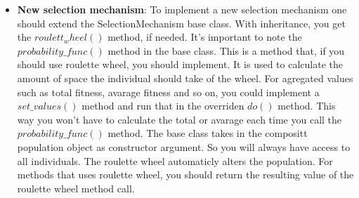 \begin{itemize}
\item \textbf{New selection mechanism}: To implement a new selection mechanism one should extend the SelectionMechanism base class. With inheritance, you get the $roulett_wheel()$ method, if needed. It's important to note the $probability\_func()$ method in the base class. This is a method that, if you should use roulette wheel, you should implement. It is used to calculate the amount of space the individual should take of the wheel. For agregated values such as total fitness, avarage fitness and so on, you could implement a $set\_values()$ method and run that in the overriden $do()$ method. This way you won't have to calculate the total or avarage each time you call the $probability\_func()$ method. The base class takes in the compositt population object as constructor argument. So you will always have access to all individuals. The roulette wheel automaticly alters the population. For methods that uses roulette wheel, you should return the resulting value of the roulette wheel method call. 

\end{itemize}


